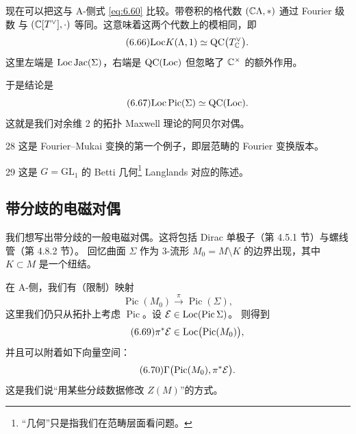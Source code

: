 现在可以把这与 A-侧式 \eqref{eq:6.60} 比较。带卷积的格代数 $(\mathbb{C}\Lambda,*)$ 通过 Fourier 级数
与 $(\mathbb{C}[T^{\vee}],\cdot)$ 等同。这意味着这两个代数上的模相同，即
\begin{equation}\tag{6.66}\label{eq:6.66}
\mathrm{Loc} K(\Lambda,1)\simeq\mathrm{QC}\bigl(T^{\vee}_{\mathbb{C}}\bigr).
\end{equation}
这里左端是 $\mathrm{Loc}\operatorname{Jac}(\Sigma)$，右端是 $\mathrm{QC}(\mathrm{Loc})$ 但忽略了 $\mathbb{C}^{\times}$ 的额外作用。

于是结论是
\begin{equation}\tag{6.67}\label{eq:6.67}
\mathrm{Loc}\operatorname{Pic}(\Sigma)\simeq\mathrm{QC}(\mathrm{Loc}).
\end{equation}
这就是我们对余维 2 的拓扑 Maxwell 理论的阿贝尔对偶。

\begin{srcrem}{28}
这是 Fourier--Mukai 变换的第一个例子，即层范畴的 Fourier 变换版本。
\end{srcrem}

\begin{srcrem}{29}
这是 $G=\mathrm{GL}_1$ 的 Betti 几何\footnote{“几何”只是指我们在范畴层面看问题。}
Langlands 对应的陈述。
\end{srcrem}


\subsection{带分歧的电磁对偶}

我们想写出带分歧的一般电磁对偶。这将包括 Dirac 单极子（第 4.5.1 节）与螺线管（第 4.8.2 节）。
回忆曲面 $\Sigma$ 作为 3-流形 $M_0=M\setminus K$ 的边界出现，其中 $K\subset M$ 是一个纽结。

在 A-侧，我们有（限制）映射
\begin{equation}\tag{6.68}\label{eq:6.68}
\operatorname{Pic}(M_0)\xrightarrow{\ \pi\ }\operatorname{Pic}(\Sigma),
\end{equation}
这里我们仍只从拓扑上考虑 $\operatorname{Pic}$。设 $\mathcal{E}\in\mathrm{Loc}(\operatorname{Pic}\Sigma)$。
则得到
\begin{equation}\tag{6.69}\label{eq:6.69}
\pi^*\mathcal{E}\in\mathrm{Loc}\bigl(\operatorname{Pic}(M_0)\bigr),
\end{equation}
并且可以附着如下向量空间：
\begin{equation}\tag{6.70}\label{eq:6.70}
\Gamma\bigl(\operatorname{Pic}(M_0),\pi^*\mathcal{E}\bigr).
\end{equation}
这是我们说“用某些分歧数据修改 $Z(M)$”的方式。

